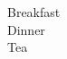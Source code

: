 \documentclass[36pt,extrafontsizes,oneside]{memoir}
\begin{document}
\vspace*{108pt}
\LARGE\scshape\bfseries\begin{flushright}
Breakfast\\
Dinner\\
Tea\\
\end{flushright}
\end{document}
